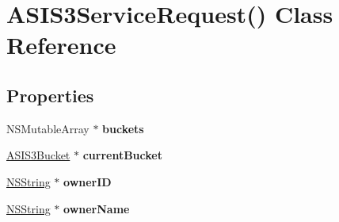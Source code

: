 \hypertarget{interface_a_s_i_s3_service_request_07_08}{
\section{\-A\-S\-I\-S3\-Service\-Request() \-Class \-Reference}
\label{interface_a_s_i_s3_service_request_07_08}
}
\subsection*{\-Properties}
\begin{DoxyCompactItemize}
\item 
\hypertarget{interface_a_s_i_s3_service_request_07_08_ad0042b313a03c8749e1b1c770ed75ffa}{
\-N\-S\-Mutable\-Array $\ast$ {\bfseries buckets}}
\label{interface_a_s_i_s3_service_request_07_08_ad0042b313a03c8749e1b1c770ed75ffa}

\item 
\hypertarget{interface_a_s_i_s3_service_request_07_08_ab53674adec981357166316fcd130390b}{
\hyperlink{interface_a_s_i_s3_bucket}{\-A\-S\-I\-S3\-Bucket} $\ast$ {\bfseries current\-Bucket}}
\label{interface_a_s_i_s3_service_request_07_08_ab53674adec981357166316fcd130390b}

\item 
\hypertarget{interface_a_s_i_s3_service_request_07_08_a9b96d69c016b32e927b507b02ed170d9}{
\hyperlink{class_n_s_string}{\-N\-S\-String} $\ast$ {\bfseries owner\-I\-D}}
\label{interface_a_s_i_s3_service_request_07_08_a9b96d69c016b32e927b507b02ed170d9}

\item 
\hypertarget{interface_a_s_i_s3_service_request_07_08_a4bbf8eb8d856089a0cd6432c16d5ac40}{
\hyperlink{class_n_s_string}{\-N\-S\-String} $\ast$ {\bfseries owner\-Name}}
\label{interface_a_s_i_s3_service_request_07_08_a4bbf8eb8d856089a0cd6432c16d5ac40}

\end{DoxyCompactItemize}


